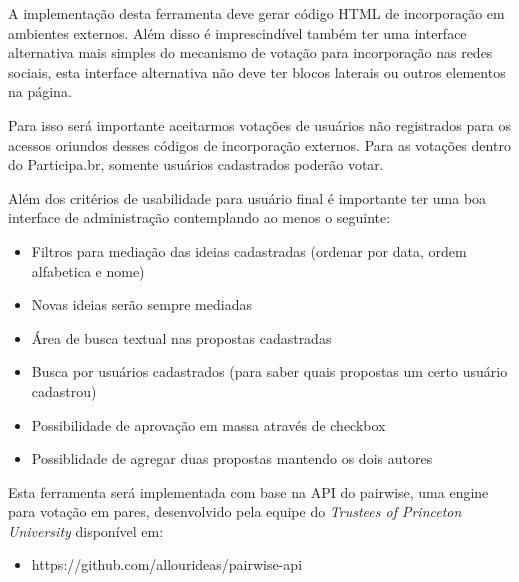\documentclass[12pt]{article}
\begin{document}
A implementação desta ferramenta deve gerar código HTML de incorporação em
ambientes externos. Além disso é imprescindível também ter uma interface
alternativa mais simples do mecanismo de votação para incorporação nas redes
sociais, esta interface alternativa não deve ter blocos laterais ou outros
elementos na página.

Para isso será importante aceitarmos votações de usuários não registrados para
os acessos oriundos desses códigos de incorporação externos. Para as votações
dentro do Participa.br, somente usuários cadastrados poderão votar.

Além dos critérios de usabilidade para usuário final é importante ter uma boa
interface de administração contemplando ao menos o seguinte:

\begin{itemize}
  \item Filtros para mediação das ideias cadastradas (ordenar por data, ordem
    alfabetica e nome)
  \item Novas ideias serão sempre mediadas
  \item Área de busca textual nas propostas cadastradas
  \item Busca por usuários cadastrados (para saber quais propostas
    um certo usuário cadastrou)
  \item Possibilidade de aprovação em massa através de checkbox
  \item Possiblidade de agregar duas propostas mantendo os dois autores
\end{itemize}


Esta ferramenta será implementada com base na API do pairwise, uma engine para
votação em pares, desenvolvido pela equipe do {\it Trustees of Princeton
University} disponível em:

\begin{itemize}
  \item https://github.com/allourideas/pairwise-api
\end{itemize}
\end{document}
